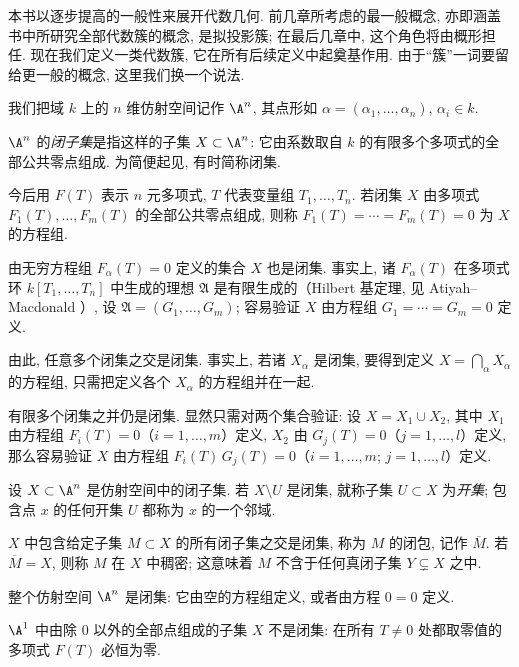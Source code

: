 本书以逐步提高的一般性来展开代数几何. 前几章所考虑的最一般概念, 亦即涵盖书中所研究全部代数簇的概念, 是拟投影簇; 在最后几章中, 这个角色将由概形担任. 现在我们定义一类代数簇, 它在所有后续定义中起奠基作用. 由于``簇''一词要留给更一般的概念, 这里我们换一个说法.

我们把域 $k$ 上的 $n$ 维仿射空间记作 $\A^n$, 其点形如 $\alpha = (\alpha_1, \ldots, \alpha_n)$, $\alpha_i \in k$.

\begin{definition}[闭子集]\label{def:closed-subset}
	$\A^n$ 的\emph{闭子集}是指这样的子集 $X \subset \A^n$: 它由系数取自 $k$ 的有限多个多项式的全部公共零点组成. 为简便起见, 有时简称闭集.
\end{definition}

今后用 $F(T)$ 表示 $n$ 元多项式, $T$ 代表变量组 $T_1, \ldots, T_n$. 若闭集 $X$ 由多项式 $F_1(T), \ldots, F_m(T)$ 的全部公共零点组成, 则称 $F_1(T) = \cdots = F_m(T) = 0$ 为 $X$ 的方程组.

由无穷方程组 $F_\alpha(T) = 0$ 定义的集合 $X$ 也是闭集. 事实上, 诸 $F_\alpha(T)$ 在多项式环 $k[T_1, \ldots, T_n]$ 中生成的理想 $\mathfrak A$ 是有限生成的（Hilbert 基定理, 见 Atiyah--Macdonald \cite[定理 7.5]{atiyah-macdonald1969}）, 设 $\mathfrak A = (G_1, \ldots, G_m)$; 容易验证 $X$ 由方程组 $G_1 = \cdots = G_m = 0$ 定义.

由此, 任意多个闭集之交是闭集. 事实上, 若诸 $X_\alpha$ 是闭集, 要得到定义 $X = \bigcap_\alpha X_\alpha$ 的方程组, 只需把定义各个 $X_\alpha$ 的方程组并在一起.

有限多个闭集之并仍是闭集. 显然只需对两个集合验证: 设 $X = X_1 \cup X_2$, 其中 $X_1$ 由方程组 $F_i(T) = 0$（$i = 1, \ldots, m$）定义, $X_2$ 由 $G_j(T) = 0$（$j = 1, \ldots, l$）定义, 那么容易验证 $X$ 由方程组 $F_i(T)\, G_j(T) = 0$（$i = 1, \ldots, m$; $j = 1, \ldots, l$）定义.

设 $X \subset \A^n$ 是仿射空间中的闭子集. 若 $X \setminus U$ 是闭集, 就称子集 $U \subset X$ 为\emph{开集}; 包含点 $x$ 的任何开集 $U$ 都称为 $x$ 的一个邻域.

$X$ 中包含给定子集 $M \subset X$ 的所有闭子集之交是闭集, 称为 $M$ 的闭包, 记作 $\overline{M}$. 若 $\overline{M} = X$, 则称 $M$ 在 $X$ 中稠密; 这意味着 $M$ 不含于任何真闭子集 $Y \subsetneq X$ 之中.

\begin{example}\label{exam:An-closed}
	整个仿射空间 $\A^n$ 是闭集: 它由空的方程组定义, 或者由方程 $0 = 0$ 定义.
\end{example}

\begin{example}\label{exam:A1-minus-0}
	$\A^1$ 中由除 $0$ 以外的全部点组成的子集 $X$ 不是闭集: 在所有 $T \ne 0$ 处都取零值的多项式 $F(T)$ 必恒为零.
\end{example}

